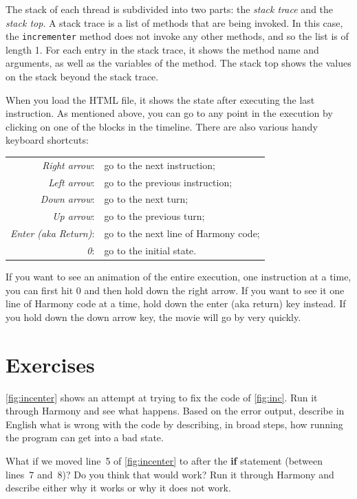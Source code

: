 \documentclass{report}
\begin{document}
The stack of each thread is subdivided into two parts: the
\emph{stack trace} and the \emph{stack top}.
A stack trace is a list of methods that are being invoked.
In this case, the \texttt{incrementer} method does not invoke any
other methods, and so the list is of length 1.
For each entry in the stack trace, it shows the method name and
arguments, as well as the variables of the method.
The stack top shows the values on the stack beyond the stack trace.

When you load the HTML file, it shows the state after executing
the last instruction.
As mentioned above, you can go to any point in the execution by
clicking on one of the blocks in the timeline.
There are also various handy keyboard shortcuts:
\begin{tabular}{rl}
\emph{Right arrow}: & go to the next instruction; \\
\emph{Left arrow}: & go to the previous instruction; \\
\emph{Down arrow}: & go to the next turn; \\
\emph{Up arrow}: & go to the previous turn; \\
\emph{Enter (aka Return)}: & go to the next line of Harmony code; \\
\emph{0}: & go to the initial state.
\end{tabular}

If you want to see an animation of the entire execution, one instruction
at a time, you can first hit 0 and then hold down the right arrow.
If you want to see it one line of Harmony code at a time, hold down the
enter (aka return) key instead.
If you hold down the down arrow key, the movie will
go by very quickly.

\section*{Exercises}

\begin{problems}
\item \autoref{fig:incenter} shows an attempt at trying to fix the code of
    \autoref{fig:inc}.  Run it through Harmony and see what happens.  Based on
    the error output, describe in English what is wrong with the code by describing,
    in broad steps, how running the program can get into a bad state.
\item What if we moved line~5 of \autoref{fig:incenter} to after the \textbf{if}
    statement (between lines~7 and~8)?  Do you think that would work?  Run it through
    Harmony and describe either why it works or why it does not work.
\end{problems}
\end{document}
